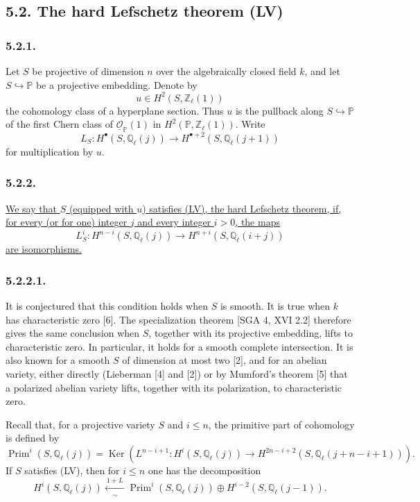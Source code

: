 \subsection*{5.2. The hard Lefschetz theorem (LV)}

\subsubsection*{5.2.1.}
Let $S$ be projective of dimension $n$ over the algebraically closed field
$k$, and let $S\hookrightarrow\mathbb P$ be a projective embedding.  Denote by
\[
u\in H^2(S,\mathbb Z_\ell(1))
\]
the cohomology class of a hyperplane section.  Thus $u$ is the pullback along
$S\hookrightarrow\mathbb P$ of the first Chern class of
$\underline{\mathcal O}_{\mathbb P}(1)$ in
$H^2(\mathbb P,\mathbb Z_\ell(1))$.  Write
\[
L_S:H^\bullet(S,\mathbb Q_\ell(j))
   \longrightarrow H^{\bullet+2}(S,\mathbb Q_\ell(j+1))
\]
for multiplication by $u$.

\subsubsection*{5.2.2.}
\underline{We say that $S$ (equipped with $u$) satisfies (LV), the hard
Lefschetz theorem, if, for every (or for one) integer $j$ and every integer
$i>0$, the maps}
\[
L_S^i:H^{n-i}(S,\mathbb Q_\ell(j))
\longrightarrow H^{n+i}(S,\mathbb Q_\ell(i+j))
\]
\underline{are isomorphisms.}

\subsubsection*{5.2.2.1.}
It is conjectured that this condition holds when $S$ is smooth.  It is true
when $k$ has characteristic zero [6].  The specialization theorem
[SGA 4, XVI 2.2] therefore gives the same conclusion when $S$, together with
its projective embedding, lifts to characteristic zero.  In particular, it
holds for a smooth complete intersection.  It is also known for a smooth $S$
of dimension at most two [2], and for an abelian variety, either directly
(Lieberman [4] and [2]) or by Mumford's theorem [5] that a polarized abelian
variety lifts, together with its polarization, to characteristic zero.

Recall that, for a projective variety $S$ and $i\leq n$, the primitive part of
cohomology is defined by
\begin{equation}\tag{5.2.2.2}
\operatorname{Prim}^i(S,\mathbb Q_\ell(j))
=\operatorname{Ker}\!\left(
L^{n-i+1}:H^i(S,\mathbb Q_\ell(j))
\longrightarrow
H^{2n-i+2}(S,\mathbb Q_\ell(j+n-i+1))
\right).
\end{equation}
If $S$ satisfies (LV), then for $i\leq n$ one has the decomposition
\begin{equation}\tag{5.2.2.3}
H^i(S,\mathbb Q_\ell(j))
\xleftarrow[\sim]{\ 1+L\ }
\operatorname{Prim}^i(S,\mathbb Q_\ell(j))
\oplus H^{i-2}(S,\mathbb Q_\ell(j-1)).
\end{equation}

